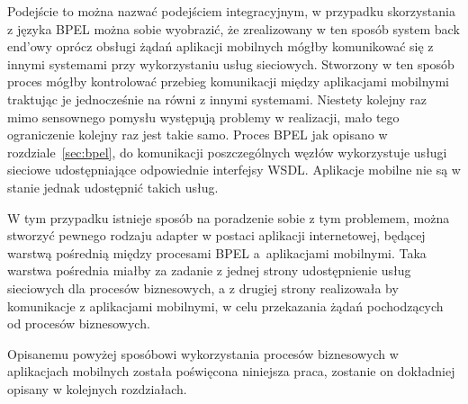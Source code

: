 Podejście to można nazwać podejściem integracyjnym, w przypadku skorzystania z języka BPEL można sobie wyobrazić, że zrealizowany w ten sposób system back end'owy oprócz obsługi żądań aplikacji mobilnych mógłby komunikować się z innymi systemami przy wykorzystaniu usług sieciowych. Stworzony w ten sposób proces mógłby kontrolować przebieg komunikacji między aplikacjami mobilnymi traktując je jednocześnie na równi z innymi systemami.  Niestety kolejny raz mimo sensownego pomysłu występują problemy w realizacji, mało tego ograniczenie kolejny raz jest takie samo. Proces BPEL jak opisano w rozdziale~\ref{sec:bpel}, do komunikacji poszczególnych węzłów wykorzystuje usługi sieciowe udostępniające odpowiednie interfejsy WSDL. Aplikacje mobilne nie są w stanie jednak udostępnić takich usług. 

W tym przypadku istnieje sposób na poradzenie sobie z tym problemem, można stworzyć pewnego rodzaju adapter w postaci aplikacji internetowej, będącej warstwą pośrednią między procesami BPEL a~aplikacjami mobilnymi. Taka warstwa pośrednia miałby za zadanie z jednej strony udostępnienie usług sieciowych dla procesów biznesowych, a z drugiej strony realizowała by komunikacje z aplikacjami mobilnymi, w celu przekazania żądań pochodzących od procesów biznesowych. 

Opisanemu powyżej sposóbowi wykorzystania procesów biznesowych w aplikacjach mobilnych została poświęcona niniejsza praca, zostanie on dokładniej opisany w kolejnych rozdziałach.

